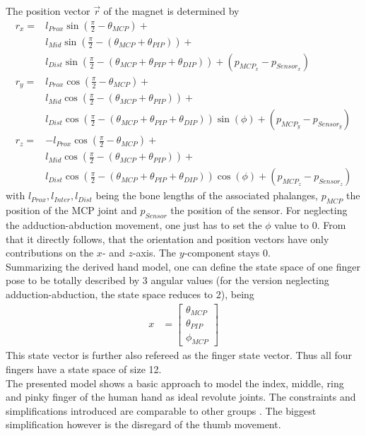 The position vector $ \vec{r} $ of the magnet is determined by
\begin{equation}\label{eq:posX}
\begin{aligned}
r_{x} =& l_{Prox}\sin(\frac{\pi}{2}-\theta_{MCP}) +\\
& l_{Mid}\sin(\frac{\pi}{2}-(\theta_{MCP}+\theta_{PIP})) +\\
& l_{Dist}\sin(\frac{\pi}{2}-(\theta_{MCP}+\theta_{PIP}+\theta_{DIP})) + (p_{MCP_{x}} - p_{Sensor_{x}}) \\[4pt]
r_{y} =& l_{Prox}\cos(\frac{\pi}{2}-\theta_{MCP}) +\\
& l_{Mid}\cos(\frac{\pi}{2}-(\theta_{MCP}+\theta_{PIP})) +\\
& l_{Dist}\cos(\frac{\pi}{2}-(\theta_{MCP}+\theta_{PIP}+\theta_{DIP}))\sin(\phi) + (p_{MCP_{y}} - p_{Sensor_{y}}) \\[4pt]
r_{z} =& -l_{Prox}\cos(\frac{\pi}{2}-\theta_{MCP}) +\\
& l_{Mid}\cos(\frac{\pi}{2}-(\theta_{MCP}+\theta_{PIP})) +\\
& l_{Dist}\cos(\frac{\pi}{2}-(\theta_{MCP}+\theta_{PIP}+\theta_{DIP}))\cos(\phi) +(p_{MCP_{z}} - p_{Sensor_{z}})
\end{aligned}
\end{equation}
with $ l_{Prox}, l_{Inter}, l_{Dist} $ being the bone lengths of the associated phalanges, $ p_{MCP} $ the position of the \ac{MCP} joint and $ p_{Sensor} $ the position of the sensor. For neglecting the adduction-abduction movement, one just has to set the $ \phi $ value to 0. From that it directly follows, that the orientation and position vectors have only contributions on the $ x $- and $ z $-axis. The $ y $-component stays 0.\\
Summarizing the derived hand model, one can define the state space of one finger pose to be totally described by 3 angular values (for the version neglecting adduction-abduction, the state space reduces to 2), being
\begin{equation*}
\begin{aligned}
x &= \begin{bmatrix}
				\theta_{MCP}\\
				\theta_{PIP}\\
				\phi_{MCP}
\end{bmatrix}
\end{aligned}
\end{equation*}
This state vector is further also refereed as the finger state vector. Thus all four fingers have a state space of size 12.\\
The presented model shows a basic approach to model the index, middle, ring and pinky finger of the human hand as ideal revolute joints. The constraints and simplifications introduced are comparable to other groups \cite{lin2000modeling}. The biggest simplification however is the disregard of the thumb movement.



